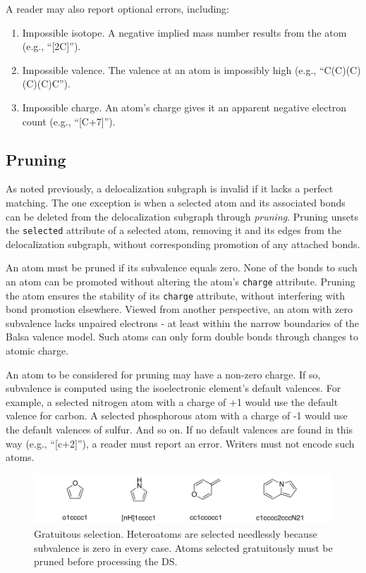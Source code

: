 \documentclass{article}
\def\ttt{\texttt}
\begin{document}
A reader may also report optional errors, including:

\begin{enumerate}
    \item{Impossible isotope. A negative implied mass number results from the atom (e.g., \enquote{[2C]}).}
    \item{Impossible valence. The valence at an atom is impossibly high (e.g., \enquote{C(C)(C)(C)(C)C}).}
    \item{Impossible charge. An atom's charge gives it an apparent negative electron count (e.g., \enquote{[C+7]}).}
\end{enumerate}

\subsection*{Pruning}

As noted previously, a delocalization subgraph is invalid if it lacks a perfect matching. The one exception is when a selected atom and its associated bonds can be deleted from the delocalization subgraph through \textit{pruning}. Pruning unsets the \ttt{selected} attribute of a selected atom, removing it and its edges from the delocalization subgraph, without corresponding promotion of any attached bonds.

An atom must be pruned if its subvalence equals zero. None of the bonds to such an atom can be promoted without altering the atom's \ttt{charge} attribute. Pruning the atom ensures the stability of its \ttt{charge} attribute, without interfering with bond promotion elsewhere. Viewed from another perspective, an atom with zero subvalence lacks unpaired electrons - at least within the narrow boundaries of the Balsa valence model. Such atoms can only form double bonds through changes to atomic charge. 

An atom to be considered for pruning may have a non-zero charge. If so, subvalence is computed using the isoelectronic element's default valences. For example, a selected nitrogen atom with a charge of +1 would use the default valence for carbon. A selected phosphorous atom with a charge of -1 would use the default valences of sulfur. And so on. If no default valences are found in this way (e.g., \enquote{[c+2]}), a reader must report an error. Writers must not encode such atoms.

\begin{figure}
    \centering
    \includegraphics[width=\columnwidth]{gratuitous-selection.pdf}
    \caption{Gratuitous selection. Heteroatoms are selected needlessly because subvalence is zero in every case. Atoms selected gratuitously must be pruned before processing the DS.}
    \label{fig:gratuitous-selection}
\end{figure}
\end{document}
